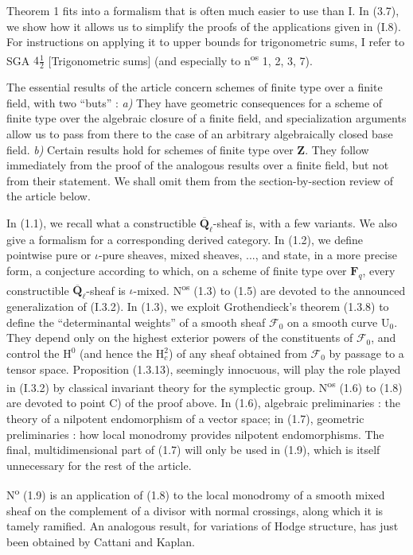 \documentclass[11pt,leqno]{article}
\begin{document}
Theorem 1 fits into a formalism that is often much easier to use than I. In (3.7), we show how it allows us to simplify the proofs of the applications given in (I.8). For instructions on applying it to upper bounds for trigonometric sums, I refer to SGA \(4\frac{1}{2}\) [Trigonometric sums] (and especially to n\textsuperscript{os} 1, 2, 3, 7).

The essential results of the article concern schemes of finite type over a finite field, with two “buts” : \textit{a)} They have geometric consequences for a scheme of finite type over the algebraic closure of a finite field, and specialization arguments allow us to pass from there to the case of an arbitrary algebraically closed base field. \textit{b)} Certain results hold for schemes of finite type over \(\mathbf{Z}\). They follow immediately from the proof of the analogous results over a finite field, but not from their statement. We shall omit them from the section-by-section review of the article below.

In (1.1), we recall what a constructible \(\overline{\mathbf{Q}}_\ell\)-sheaf is, with a few variants. We also give a formalism for a corresponding derived category. In (1.2), we define pointwise pure or \(\iota\)-pure sheaves, mixed sheaves, ..., and state, in a more precise form, a conjecture according to which, on a scheme of finite type over \(\mathbf{F}_q\), every constructible \(\overline{\mathbf{Q}}_\ell\)-sheaf is \(\iota\)-mixed. N\textsuperscript{os} (1.3) to (1.5) are devoted to the announced generalization of (I.3.2). In (1.3), we exploit Grothendieck’s theorem (1.3.8) to define the “determinantal weights” of a smooth sheaf \(\mathscr{F}_0\) on a smooth curve \(\mathrm{U}_0\). They depend only on the highest exterior powers of the constituents of \(\mathscr{F}_0\), and control the \(\mathrm{H}^0\) (and hence the \(\mathrm{H}_c^2\)) of any sheaf obtained from \(\mathscr{F}_0\) by passage to a tensor space. Proposition (1.3.13), seemingly innocuous, will play the role played in (I.3.2) by classical invariant theory for the symplectic group. N\textsuperscript{os} (1.6) to (1.8) are devoted to point C) of the proof above. In (1.6), algebraic preliminaries : the theory of a nilpotent endomorphism of a vector space; in (1.7), geometric preliminaries : how local monodromy provides nilpotent endomorphisms. The final, multidimensional part of (1.7) will only be used in (1.9), which is itself unnecessary for the rest of the article.

N\textsuperscript{o} (1.9) is an application of (1.8) to the local monodromy of a smooth mixed sheaf on the complement of a divisor with normal crossings, along which it is tamely ramified. An analogous result, for variations of Hodge structure, has just been obtained by Cattani and Kaplan.
\end{document}
